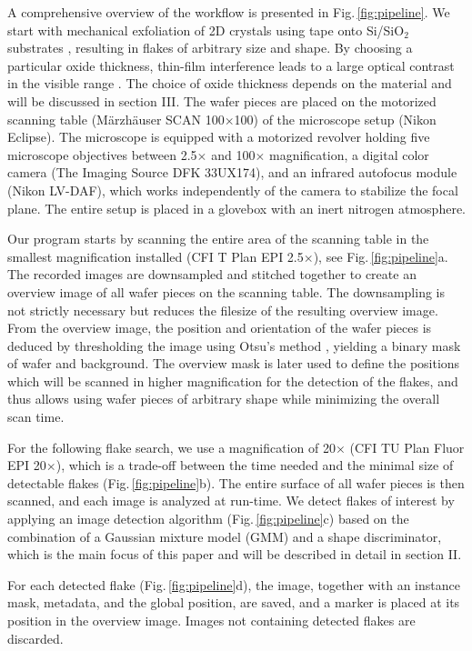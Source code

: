 \documentclass[reprint, prl, superscriptaddress, floatfix]{revtex4-2}
\newcommand{\fig}[1]{Fig.\,\ref{#1}}
\begin{document}
A comprehensive overview of the workflow is presented in \fig{fig:pipeline}.
We start with mechanical exfoliation of 2D crystals using tape onto Si/SiO$_2$ substrates \cite{Huang2015}, resulting in flakes of arbitrary size and shape.
By choosing a particular oxide thickness, thin-film interference leads to a large optical contrast in the visible range \cite{Blake2007, Muller2015}.
The choice of oxide thickness depends on the material and will be discussed in section III.
The wafer pieces are placed on the motorized scanning table (M\"arzh\"auser SCAN 100$\times$100) of the microscope setup (Nikon Eclipse).
The microscope is equipped with a motorized revolver holding five microscope objectives between 2.5$\times$ and 100$\times$ magnification, a digital color camera (The Imaging Source DFK 33UX174), and an infrared autofocus module (Nikon LV-DAF), which works independently of the camera to stabilize the focal plane.
The entire setup is placed in a glovebox with an inert nitrogen atmosphere. 

Our program starts by scanning the entire area of the scanning table in the smallest magnification installed (CFI T Plan EPI 2.5$\times$), see \fig{fig:pipeline}a. 
The recorded images are downsampled and stitched together to create an overview image of all wafer pieces on the scanning table. 
The downsampling is not strictly necessary but reduces the filesize of the resulting overview image. 
From the overview image, the position and orientation of the wafer pieces is deduced by thresholding the image using Otsu's method \cite{Otsu1979}, yielding a binary mask of wafer and background.
The overview mask is later used to define the positions which will be scanned in higher magnification for the detection of the flakes, and thus allows using wafer pieces of arbitrary shape while minimizing the overall scan time.

For the following flake search, we use a magnification of 20$\times$ (CFI TU Plan Fluor EPI 20$\times$), which is a trade-off between the time needed and the minimal size of detectable flakes (\fig{fig:pipeline}b).
The entire surface of all wafer pieces is then scanned, and each image is analyzed at run-time. 
We detect flakes of interest by applying an image detection algorithm  (\fig{fig:pipeline}c) based on the combination of a Gaussian mixture model (GMM) and a shape discriminator, which is the main focus of this paper and will be described in detail in section II. 

For each detected flake  (\fig{fig:pipeline}d), the image, together with an instance mask, metadata, and the global position, are saved, and a marker is placed at its position in the overview image.
Images not containing detected flakes are discarded.
\end{document}
